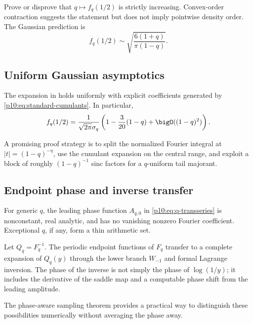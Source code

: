 \documentclass[11pt]{article}
\numberwithin{equation}{section}
\theoremstyle{definition}
\theoremstyle{remark}
\begin{document}
\begin{problem}
Prove or disprove that $q\mapsto f_q(1/2)$ is strictly increasing.  Convex-order contraction
suggests the statement but does not imply pointwise density order.  The Gaussian prediction is
\[
 f_q(1/2)\sim\sqrt{\frac{6(1+q)}{\pi(1-q)}}.
\]
\end{problem}

\subsection{Uniform Gaussian asymptotics}

\begin{conjecture}
The expansion in  holds uniformly with explicit coefficients generated by
\eqref{p10:eq:standard-cumulants}.  In particular,
\[
 f_q(1/2)
 =\frac{1}{\sqrt{2\pi}\sigma_q}
  \left(1-\frac{3}{20}(1-q)+\bigO((1-q)^2)\right).
\]
\end{conjecture}

A promising proof strategy is to split the normalized Fourier integral at
$|t|=(1-q)^{-\eta}$, use the cumulant expansion on the central range, and exploit a block of
roughly $(1-q)^{-1}$ sinc factors for a $q$-uniform tail majorant.

\subsection{Endpoint phase and inverse transfer}

\begin{conjecture}
For generic $q$, the leading phase function $A_{q,0}$ in
\eqref{p10:eq:q-transseries} is nonconstant, real analytic, and has no vanishing nonzero Fourier
coefficient.  Exceptional $q$, if any, form a thin arithmetic set.
\end{conjecture}

\begin{conjecture}
Let $Q_q=F_q^{-1}$.  The periodic endpoint functions of $F_q$ transfer to a complete expansion
of $Q_q(y)$ through the lower branch $W_{-1}$ and formal Lagrange inversion.  The phase of the
inverse is not simply the phase of $\log(1/y)$; it includes the derivative of the saddle map
and a computable phase shift from the leading amplitude.
\end{conjecture}

The phase-aware sampling theorem provides a practical way to distinguish these possibilities
numerically without averaging the phase away.
\end{document}
